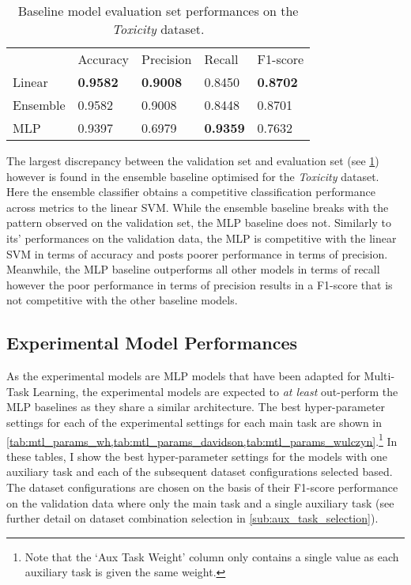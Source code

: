 \begin{table}[h]
  \centering
  \begin{tabular}{lllll}
                          & Accuracy        & Precision       & Recall          & F1-score        \\
    Linear                & \textbf{0.9582} & \textbf{0.9008} & 0.8450          & \textbf{0.8702} \\
    Ensemble\footnotemark & 0.9582          & 0.9008          & 0.8448          & 0.8701          \\
    MLP                   & 0.9397          & 0.6979          & \textbf{0.9359} & 0.7632
  \end{tabular}
  \caption{Baseline model evaluation set performances on the \textit{Toxicity} dataset.}
  \label{tab:baseline_test_wulczyn}
\end{table}

The largest discrepancy between the validation set and evaluation set (see \cref{tab:baseline_test_wulczyn}) however is found in the ensemble baseline optimised for the \textit{Toxicity} dataset.
Here the ensemble classifier obtains a competitive classification performance across metrics to the linear SVM.
While the ensemble baseline breaks with the pattern observed on the validation set, the MLP baseline does not.
Similarly to its' performances on the validation data, the MLP is competitive with the linear SVM in terms of accuracy and posts poorer performance in terms of precision.
Meanwhile, the MLP baseline outperforms all other models in terms of recall however the poor performance in terms of precision results in a F1-score that is not competitive with the other baseline models.

\subsection{Experimental Model Performances}
As the experimental models are MLP models that have been adapted for Multi-Task Learning, the experimental models are expected to \textit{at least} out-perform the MLP baselines as they share a similar architecture.
The best hyper-parameter settings for each of the experimental settings for each main task are shown in \cref{tab:mtl_params_wh,tab:mtl_params_davidson,tab:mtl_params_wulczyn}.\footnote{Note that the `Aux Task Weight' column only contains a single value as each auxiliary task is given the same weight.}
In these tables, I show the best hyper-parameter settings for the models with one auxiliary task and each of the subsequent dataset configurations selected based.
The dataset configurations are chosen on the basis of their F1-score performance on the validation data where only the main task and a single auxiliary task (see further detail on dataset combination selection in \cref{sub:aux_task_selection}).


